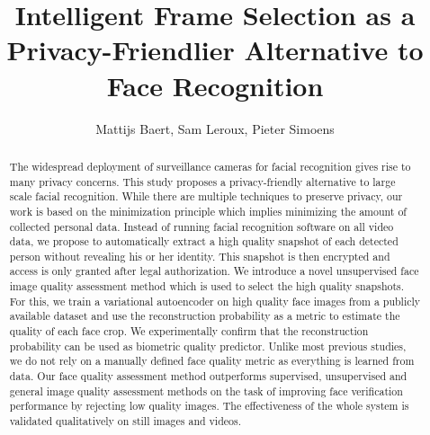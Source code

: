 \documentclass[letterpaper]{article} %
\title{Intelligent Frame Selection as a  Privacy-Friendlier Alternative to Face Recognition
}
\author{
    Mattijs Baert,
    Sam Leroux,
    Pieter Simoens
    \\
}
\begin{document}
\maketitle

\begin{abstract}
The widespread deployment of surveillance cameras for facial recognition gives rise to many privacy concerns. This study proposes a privacy-friendly alternative to large scale facial recognition. While there are multiple techniques to preserve privacy, our work is based on the minimization principle which implies minimizing the amount of collected personal data. Instead of running facial recognition software on all video data, we propose to automatically extract a high quality snapshot of each detected person without revealing his or her identity. This snapshot is then encrypted and access is only granted after legal authorization. We introduce a novel unsupervised face image quality assessment method which is used to select the high quality snapshots. For this, we train a variational autoencoder on high quality face images from a publicly available dataset and use the reconstruction probability as a metric to estimate the quality of each face crop. We experimentally  confirm that the reconstruction probability can be used as biometric quality predictor. Unlike most previous studies, we do not rely on a manually defined face quality metric as everything is learned from data. Our face quality assessment method outperforms supervised, unsupervised and general image quality assessment methods on the task of improving face verification performance by rejecting low quality images. The effectiveness of the whole system is validated qualitatively on still images and videos.
\end{abstract}
\end{document}
